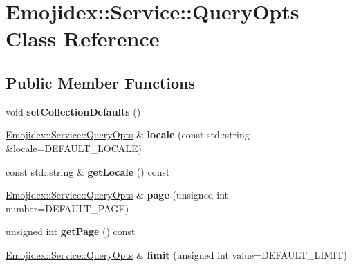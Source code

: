 \hypertarget{classEmojidex_1_1Service_1_1QueryOpts}{}\section{Emojidex\+:\+:Service\+:\+:Query\+Opts Class Reference}
\label{classEmojidex_1_1Service_1_1QueryOpts}
\subsection*{Public Member Functions}
\begin{DoxyCompactItemize}
\item 
void {\bfseries set\+Collection\+Defaults} ()\hypertarget{classEmojidex_1_1Service_1_1QueryOpts_a8644a708f05f9cc96d2a58021c2c58ad}{}\label{classEmojidex_1_1Service_1_1QueryOpts_a8644a708f05f9cc96d2a58021c2c58ad}

\item 
\hyperlink{classEmojidex_1_1Service_1_1QueryOpts}{Emojidex\+::\+Service\+::\+Query\+Opts} \& {\bfseries locale} (const std\+::string \&locale=D\+E\+F\+A\+U\+L\+T\+\_\+\+L\+O\+C\+A\+LE)\hypertarget{classEmojidex_1_1Service_1_1QueryOpts_aaf1f11b06b53a16a21a664225b16ddd6}{}\label{classEmojidex_1_1Service_1_1QueryOpts_aaf1f11b06b53a16a21a664225b16ddd6}

\item 
const std\+::string \& {\bfseries get\+Locale} () const \hypertarget{classEmojidex_1_1Service_1_1QueryOpts_a21ac7ce8f5aabc514b9febb5ef98c7a1}{}\label{classEmojidex_1_1Service_1_1QueryOpts_a21ac7ce8f5aabc514b9febb5ef98c7a1}

\item 
\hyperlink{classEmojidex_1_1Service_1_1QueryOpts}{Emojidex\+::\+Service\+::\+Query\+Opts} \& {\bfseries page} (unsigned int number=D\+E\+F\+A\+U\+L\+T\+\_\+\+P\+A\+GE)\hypertarget{classEmojidex_1_1Service_1_1QueryOpts_a09de9071d7d678fc2cbfd3b625261b22}{}\label{classEmojidex_1_1Service_1_1QueryOpts_a09de9071d7d678fc2cbfd3b625261b22}

\item 
unsigned int {\bfseries get\+Page} () const \hypertarget{classEmojidex_1_1Service_1_1QueryOpts_ab09d80f6810994e9f17eb69e0bf5bbd2}{}\label{classEmojidex_1_1Service_1_1QueryOpts_ab09d80f6810994e9f17eb69e0bf5bbd2}

\item 
\hyperlink{classEmojidex_1_1Service_1_1QueryOpts}{Emojidex\+::\+Service\+::\+Query\+Opts} \& {\bfseries limit} (unsigned int value=D\+E\+F\+A\+U\+L\+T\+\_\+\+L\+I\+M\+IT)\hypertarget{classEmojidex_1_1Service_1_1QueryOpts_a3a462f0647c4229aa24016c7e3fc24ea}{}\label{classEmojidex_1_1Service_1_1QueryOpts_a3a462f0647c4229aa24016c7e3fc24ea}


\end{DoxyCompactItemize}
